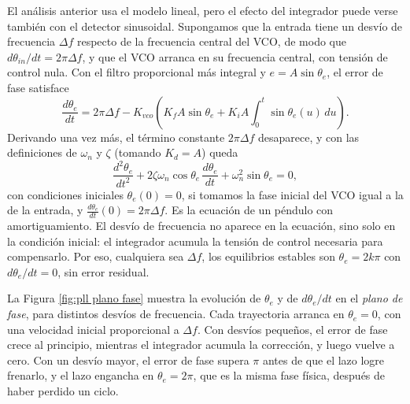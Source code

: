 El análisis anterior usa el modelo lineal, pero el efecto del integrador puede verse también con el detector sinusoidal. Supongamos que la entrada tiene un desvío de frecuencia $\Delta f$ respecto de la frecuencia central del VCO, de modo que $d\theta_{in}/dt=2\pi\Delta f$, y que el VCO arranca en su frecuencia central, con tensión de control nula. Con el filtro proporcional más integral y $e=A\sin\theta_e$, el error de fase satisface
\begin{equation*}
    \frac{d\theta_e}{dt} = 2\pi\Delta f - K_{vco}\left(K_f A\sin\theta_e + K_iA\int_0^t\sin\theta_e(u)\,du\right).
\end{equation*}
Derivando una vez más, el término constante $2\pi\Delta f$ desaparece, y con las definiciones de $\omega_n$ y $\zeta$ (tomando $K_d=A$) queda
\begin{equation}\label{eq:pll segundo orden no lineal}
    \frac{d^2\theta_e}{dt^2} + 2\zeta\omega_n\cos\theta_e\,\frac{d\theta_e}{dt} + \omega_n^2\sin\theta_e = 0,
\end{equation}
con condiciones iniciales $\theta_e(0)=0$, si tomamos la fase inicial del VCO igual a la de la entrada, y $\frac{d\theta_e}{dt}(0)=2\pi\Delta f$. Es la ecuación de un péndulo con amortiguamiento. El desvío de frecuencia no aparece en la ecuación, sino solo en la condición inicial: el integrador acumula la tensión de control necesaria para compensarlo. Por eso, cualquiera sea $\Delta f$, los equilibrios estables son $\theta_e=2k\pi$ con $d\theta_e/dt=0$, sin error residual.

La Figura \ref{fig:pll plano fase} muestra la evolución de $\theta_e$ y de $d\theta_e/dt$ en el \emph{plano de fase}, para distintos desvíos de frecuencia. Cada trayectoria arranca en $\theta_e=0$, con una velocidad inicial proporcional a $\Delta f$. Con desvíos pequeños, el error de fase crece al principio, mientras el integrador acumula la corrección, y luego vuelve a cero. Con un desvío mayor, el error de fase supera $\pi$ antes de que el lazo logre frenarlo, y el lazo engancha en $\theta_e=2\pi$, que es la misma fase física, después de haber perdido un ciclo.

